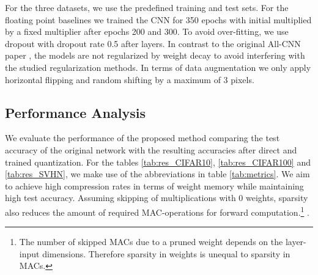 For the three datasets, we use the predefined training and test sets. For the floating point baselines we trained the CNN for 350 epochs with initial  multiplied by a fixed multiplier after epochs 200 and 300. To avoid over-fitting, we use dropout with dropout rate 0.5 after layers. In contrast to the original All-CNN paper \cite{Springenberg2015}, the models are not regularized by weight decay to avoid interfering with the studied regularization methods. In terms of data augmentation we only apply horizontal flipping and random shifting by a maximum of 3 pixels. 

\subsection{Performance Analysis}
We evaluate the performance of the proposed method comparing the test accuracy of the original network with the resulting accuracies after direct and trained quantization. For the tables \ref{tab:res_CIFAR10}, \ref{tab:res_CIFAR100} and \ref{tab:res_SVHN}, we make use of the abbreviations in table \ref{tab:metrics}.
We aim to achieve high compression rates in terms of weight memory while maintaining high test accuracy.  Assuming skipping of multiplications with 0 weights, sparsity also reduces the amount of required MAC-operations for forward computation.\footnote{The number of skipped MACs due to a pruned weight depends on the layer-input dimensions. Therefore sparsity in weights is unequal to sparsity in MACs.} .





